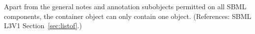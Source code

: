Apart from the general notes and annotation subobjects permitted on all
SBML components, the  container object can only contain one
\Model object.  (References: SBML L3V1 Section~\ref{sec:listof}.)
